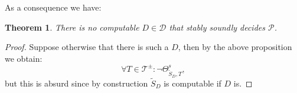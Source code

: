 \documentclass{amsart}  %
\numberwithin{equation}{section}
\newtheorem{theorem}[equation]{Theorem}
\newtheorem{lemma}[equation]{Lemma}
\newtheorem{definition}[equation]{Definition}
\theoremstyle{definition}
\theoremstyle{remark}
\begin{document}
{As a consequence we have:
\begin{theorem} There is no computable $D \in \mathcal{D}$ that  stably soundly decides $\mathcal{P}$. 
\end{theorem}
\begin{proof} Suppose otherwise that there is such a $D$, then by the above proposition we obtain:
\begin{equation*} 
\forall T \in \mathcal{T} ^{\pm}:    \neg \Theta ^{s} _{\widetilde{S} _{D} , {T}},
\end{equation*}
but this is absurd since by construction $\widetilde{S} _{D}  $ is computable if $D$ is.
\end{proof}


%    
}
\end{document}
